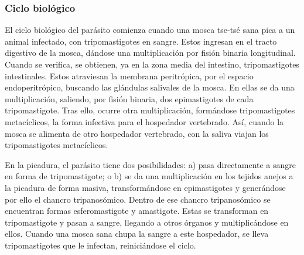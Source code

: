 \subsubsection{Ciclo biológico}
El ciclo biológico del parásito comienza cuando una mosca tse-tsé sana pica a un animal infectado, con tripomastigotes en sangre. Estos ingresan en el  tracto digestivo de la mosca, dándose una multiplicación por fisión binaria longitudinal. Cuando se verifica, se obtienen, ya en la zona media del intestino, tripomastigotes intestinales. Estos atraviesan la membrana peritrópica, por el espacio endoperitrópico, buscando las glándulas salivales de la mosca. En ellas se da una multiplicación, saliendo, por fisión binaria, dos epimastigotes de cada tripomastigote. Tras ello, ocurre otra multiplicación, formándose tripomastigotes metacíclicos, la forma infectiva para el hospedador vertebrado. Así, cuando la mosca se alimenta de otro hospedador vertebrado, con la saliva viajan los tripomastigotes metacíclicos.

En la picadura, el parásito tiene dos posibilidades: a) pasa directamente a sangre en forma de tripomastigote; o b) se da una multiplicación en los tejidos anejos a la picadura de forma masiva, transformándose en epimastigotes y generándose por ello el chancro tripanosómico. Dentro de ese chancro tripanosómico se encuentran formas esferomastigote y amastigote. Estas se transforman en tripomastigote y pasan a sangre, llegando a otros órganos y multiplicándose en ellos. Cuando una mosca sana chupa la sangre a este hospedador, se lleva tripomastigotes que le infectan, reiniciándose el ciclo.

